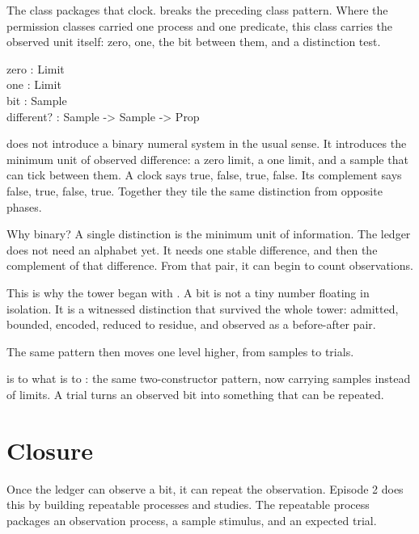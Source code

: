 The class  packages that clock.
 breaks the preceding class pattern. Where the permission classes
carried one process and one predicate, this class carries the observed unit
itself: zero, one, the bit between them, and a distinction test.

\begin{leancode}
\quad zero : Limit\\
\quad one : Limit\\
\quad bit : Sample\\
\quad different? : Sample -> Sample -> Prop
\end{leancode}

 does not introduce a binary numeral system in the usual sense.
It introduces the minimum unit of observed difference: a zero limit, a one
limit, and a sample that can tick between them. A clock says true, false, true,
false. Its complement says false, true, false, true. Together they tile the
same distinction from opposite phases.

\begin{sidebar}{Why binary?}
\label{sb:why-binary}
A single distinction is the minimum unit of information. The ledger does not
need an alphabet yet. It needs one stable difference, and then the complement
of that difference. From that pair, it can begin to count observations.
\end{sidebar}

This is why the tower began with . A bit is not a tiny
number floating in isolation. It is a witnessed distinction that survived the
whole tower: admitted, bounded, encoded, reduced to residue, and observed as a
before-after pair.

The same pattern then moves one level higher, from samples to trials.

 is to  what  is to : the
same two-constructor pattern, now carrying samples instead of limits. A trial
turns an observed bit into something that can be repeated.

\section{Closure}
\label{se:closure-first-appearance}

Once the ledger can observe a bit, it can repeat the observation. Episode 2
does this by building repeatable processes and studies. The repeatable process
packages an observation process, a sample stimulus, and an expected trial.

